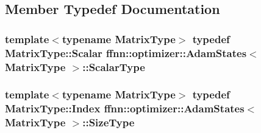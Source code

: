 \subsection{Member Typedef Documentation}
\hypertarget{classffnn_1_1optimizer_1_1_adam_states_a101ae88e46a38141a8fcf99a5382d448}{
\subsubsection[{Scalar\-Type}]{\setlength{\rightskip}{0pt plus 5cm}template$<$typename Matrix\-Type$>$ typedef Matrix\-Type\-::\-Scalar {\bf ffnn\-::optimizer\-::\-Adam\-States}$<$ Matrix\-Type $>$\-::{\bf Scalar\-Type}}}\label{classffnn_1_1optimizer_1_1_adam_states_a101ae88e46a38141a8fcf99a5382d448}
\hypertarget{classffnn_1_1optimizer_1_1_adam_states_a02c5c9a4b2a5689061570f493e842f0b}{
\subsubsection[{Size\-Type}]{\setlength{\rightskip}{0pt plus 5cm}template$<$typename Matrix\-Type$>$ typedef Matrix\-Type\-::\-Index {\bf ffnn\-::optimizer\-::\-Adam\-States}$<$ Matrix\-Type $>$\-::{\bf Size\-Type}}}\label{classffnn_1_1optimizer_1_1_adam_states_a02c5c9a4b2a5689061570f493e842f0b}


